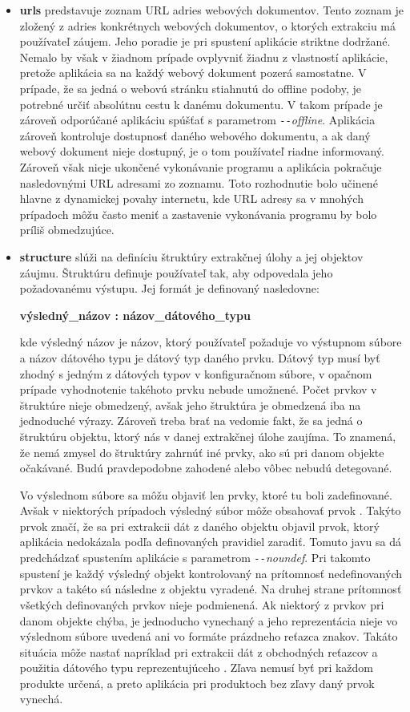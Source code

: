 \begin{itemize}
  \item \textbf{urls} predstavuje zoznam URL adries webových dokumentov. Tento zoznam je zložený z adries konkrétnych webových dokumentov, o ktorých extrakciu má používateľ záujem. Jeho poradie je pri spustení aplikácie striktne dodržané. Nemalo by však v žiadnom prípade ovplyvniť žiadnu z vlastností aplikácie, pretože aplikácia sa na každý webový dokument pozerá samostatne. V prípade, že sa jedná o webovú stránku stiahnutú do offline podoby, je potrebné určiť absolútnu cestu k danému dokumentu. V takom prípade je zároveň odporúčané aplikáciu spúšťať s parametrom \textit{\texttt{-{}-}offline}. Aplikácia zároveň kontroluje dostupnosť daného webového dokumentu, a ak daný webový dokument nieje dostupný, je o tom používateľ riadne informovaný. Zároveň však nieje ukončené vykonávanie programu a aplikácia pokračuje nasledovnými URL adresami zo zoznamu. Toto rozhodnutie bolo učinené hlavne z dynamickej povahy internetu, kde URL adresy sa v mnohých prípadoch môžu často meniť a zastavenie vykonávania programu by bolo príliš obmedzujúce. 
  
  \item \textbf{structure} slúži na definíciu štruktúry extrakčnej úlohy a jej objektov záujmu. Štruktúru definuje používateľ tak, aby odpovedala jeho požadovanému výstupu. Jej formát je definovaný nasledovne:
  
  \textbf{výsledný\_názov : názov\_dátového\_typu}
  
  kde výsledný názov je názov, ktorý používateľ požaduje vo výstupnom súbore a názov dátového typu je dátový typ daného prvku. Dátový typ musí byť zhodný s jedným z dátových typov v konfiguračnom súbore, v opačnom prípade vyhodnotenie takéhoto prvku nebude umožnené. Počet prvkov v štruktúre nieje obmedzený, avšak jeho štruktúra je obmedzená iba na jednoduché výrazy. Zároveň treba brať na vedomie fakt, že sa jedná o štruktúru objektu, ktorý nás v danej extrakčnej úlohe zaujíma. To znamená, že nemá zmysel do štruktúry zahrnúť iné prvky, ako sú pri danom objekte očakávané. Budú pravdepodobne zahodené alebo vôbec nebudú detegované.
  
  Vo výslednom súbore sa môžu objaviť len prvky, ktoré tu boli zadefinované. Avšak v niektorých prípadoch výsledný súbor môže obsahovať prvok . Takýto prvok značí, že sa pri extrakcii dát z daného objektu objavil prvok, ktorý aplikácia nedokázala podľa definovaných pravidiel zaradiť. Tomuto javu sa dá predchádzať spustením aplikácie s parametrom \textit{\texttt{-{}-}noundef}. Pri takomto spustení je každý výsledný objekt kontrolovaný na prítomnosť nedefinovaných prvkov a takéto sú následne z objektu vyradené. Na druhej strane prítomnosť všetkých definovaných prvkov nieje podmienená. Ak niektorý z prvkov pri danom objekte chýba, je jednoducho vynechaný a jeho reprezentácia nieje vo výslednom súbore uvedená ani vo formáte prázdneho reťazca znakov. Takáto situácia môže nastať napríklad pri extrakcii dát z obchodných reťazcov a použitia dátového typu reprezentujúceho . Zľava nemusí byť pri každom produkte určená, a preto aplikácia pri produktoch bez zľavy daný prvok vynechá.
  

\end{itemize}
